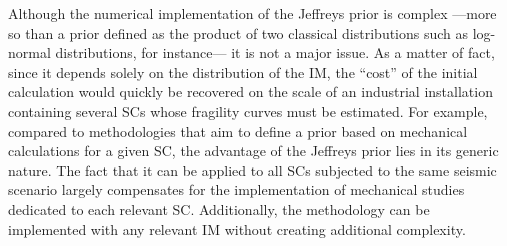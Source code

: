 Although the numerical implementation of the Jeffreys prior is complex ---more so than a prior defined as the product of two classical distributions such as log-normal distributions, for instance--- it is not a major issue. As a matter of fact, since it depends solely on the distribution of the IM, the ``cost'' of the initial calculation would quickly be recovered on the scale of an industrial installation containing several SCs whose fragility curves must be estimated. {For example, compared to methodologies that aim to define a prior based on mechanical calculations for a given SC, the advantage of the Jeffreys prior lies in its generic nature. The fact that it can be applied to all SCs subjected to the same seismic scenario largely compensates for the implementation of mechanical studies dedicated to each relevant SC. Additionally, the methodology can be implemented with any relevant IM without creating additional complexity.}













